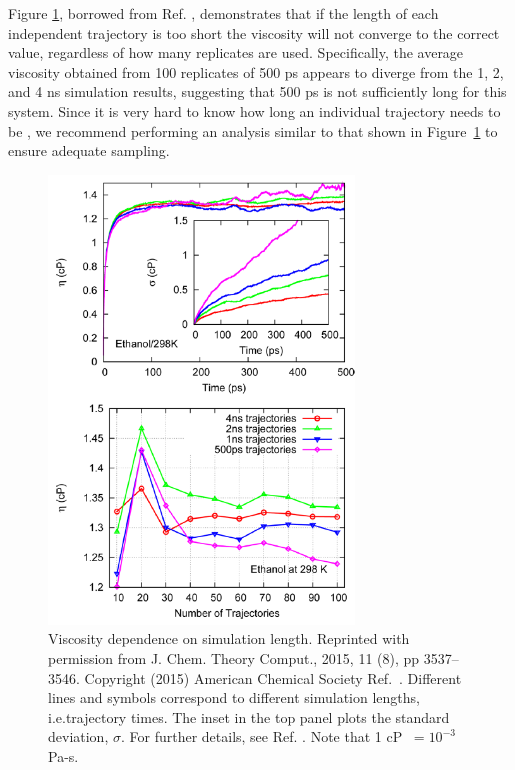 \documentclass[9pt,bestpractices]{livecoms}
\providecommand{\DIFadd}[1]{{\protect\color{blue}\uwave{#1}}} %
\providecommand{\DIFaddbegin}{} %
\providecommand{\DIFaddend}{} %
\providecommand{\DIFaddFL}[1]{\DIFadd{#1}} %
\providecommand{\DIFaddbeginFL}{} %
\providecommand{\DIFaddendFL}{} %
\begin{document}
Figure \ref{fig:ZhangFig8}, borrowed from Ref. \cite{Zhang2015}, demonstrates that if the length of each independent trajectory is too short the viscosity will not converge to the correct value, regardless of how many replicates are used. Specifically, the average viscosity obtained from 100 replicates of 500 ps appears to diverge from the 1, 2, and 4 ns simulation results, suggesting that 500 ps is not sufficiently long for this system. Since it is very hard to know how long an individual trajectory needs to be \DIFaddbegin \textit{\DIFadd{a priori}}\DIFaddend , we recommend performing an analysis similar to that shown in Figure~\ref{fig:ZhangFig8} to ensure adequate sampling.

\begin{figure}[htb!]
	\centering
	\includegraphics[width=3.2in]{ZhangFig8.png}
	\caption{Viscosity dependence on simulation length. Reprinted with permission from J. Chem. Theory Comput., 2015, 11 (8), pp 3537–3546. Copyright (2015) American Chemical Society Ref.\ \cite{Zhang2015}. Different lines and symbols correspond to different simulation lengths, i.e.\DIFaddbeginFL \DIFaddFL{, }\DIFaddendFL trajectory times. The inset in the top panel plots the standard deviation, $\sigma$. For further details, see Ref. \cite{Zhang2015}. Note that 1 cP $\ = 10^{-3}$ Pa-s.}
	\label{fig:ZhangFig8}
\end{figure}
\end{document}
